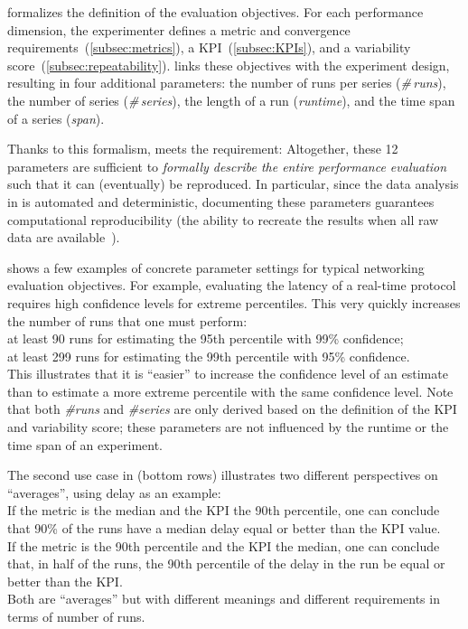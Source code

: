\triscale formalizes the definition of the evaluation objectives. For each performance dimension, the experimenter defines a metric and convergence requirements~(\cref{subsec:metrics}), a KPI~(\cref{subsec:KPIs}), and a variability score~(\cref{subsec:repeatability}).
\triscale links these objectives with the experiment design, resulting in four additional parameters: the number of runs per series (\emph{\#\,runs}), the number of series (\emph{\#\,series}), the length of a run (\emph{runtime}), and the time span of a series (\emph{span}).

Thanks to this formalism, \triscale meets the  requirement:
Altogether, these 12 parameters are sufficient to \emph{formally describe the entire performance evaluation} such that it can (eventually) be reproduced.
In particular, since the data analysis in \triscale is automated and deterministic, documenting these parameters guarantees computational reproducibility (the ability to recreate the results when all raw data are available~\cite{liu19computational}).

 shows a few examples of concrete parameter settings for typical networking evaluation objectives.
For example, evaluating the latency of a real-time protocol requires high confidence levels for extreme percentiles.
This very quickly increases the number of runs that one must perform:\\
\inlineitem
  at least 90 runs for estimating the 95th percentile with 99\% confidence;\\
\inlineitem
  at least 299 runs for estimating the 99th percentile with 95\% confidence.\\
This illustrates that it is ``easier'' to increase the confidence level of an estimate than to estimate a more extreme percentile with the same confidence level.
Note that both \emph{\#runs} and \emph{\#series} are only derived based on the definition of the KPI and variability score; these parameters are not influenced by the runtime or the time span of an experiment.

The second use case in  (bottom rows) illustrates two different perspectives on ``averages'', using delay as an example:\\
\inlineitem
  If the metric is the median and the KPI the 90th percentile, one can conclude that 90\% of the runs have a median delay equal or better than the KPI value.\\
\inlineitem
  If the metric is the 90th percentile and the KPI the median, one can conclude that, in half of the runs, the 90th percentile of the delay in the run be equal or better than the KPI.\\
Both are ``averages'' but with different meanings and different requirements in terms of number of runs.


